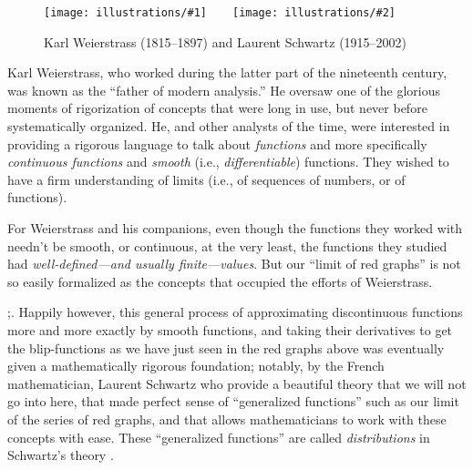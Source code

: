 \documentclass[openany]{book}
\newcommand{\illtwo}[4]{%
   \begin{figure}[H]\centering%
   \texttt{[image: illustrations/\#1]}$\qquad$\texttt{[image: illustrations/\#2]}%
   \caption{#4}%
    \end{figure}}
\theoremstyle{plain}
\theoremstyle{definition}
\begin{document}
   
 
 \illtwo{weierstrass}{schwartz}{.3}{Karl Weierstrass (1815--1897) and Laurent Schwartz (1915--2002)} 
 
 Karl Weierstrass, who worked during the latter part of the nineteenth
 century, was known as the ``father of modern analysis.'' He oversaw
 one of the glorious moments of rigorization of concepts that were
 long in use, but never before systematically organized.  He, and
 other analysts of the time, were interested in providing a rigorous
 language to talk about {\it functions} and more specifically {\it
   continuous functions} and {\it smooth} (i.e., {\it differentiable})
 functions. They wished to have a firm understanding of limits (i.e.,
 of sequences of numbers, or of functions).
 
   
 For Weierstrass and his companions, even though the functions they
 worked with needn't be smooth, or continuous, at the very least, the
 functions they studied had {\it well-defined---and usually
   finite---values}.  But our ``limit of red graphs'' is not so easily
 formalized as the concepts that occupied the efforts of
 Weierstrass.
 
 ;. Happily however, this general process of approximating
 discontinuous functions more and more exactly by smooth functions,
 and taking their derivatives to get the blip-functions as we have
 just seen in the red graphs above was eventually given a
 mathematically rigorous foundation; notably, by the French
 mathematician, Laurent Schwartz who provide a beautiful theory that
 we will not go into here, that made perfect sense of ``generalized
 functions'' such as our limit of the series of red graphs, and that
 allows mathematicians to work with these concepts with ease. These
 ``generalized functions'' are called {\it distributions} in
 Schwartz's theory .
\end{document}
